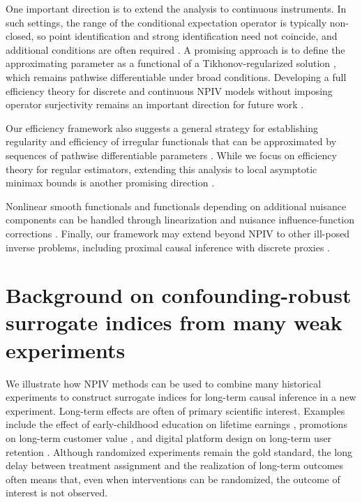 \documentclass[11pt]{article}
\theoremstyle{plain}
\theoremstyle{definition}
\theoremstyle{remark}
\theoremstyle{definition}
\begin{document}
One important direction is to extend the analysis to continuous instruments. In
such settings, the range of the conditional expectation operator is typically
non-closed, so point identification and strong identification need not coincide,
and additional conditions are often required
\citep{severini2006some, darolles2011nonparametric, bennett2023inference}. A
promising approach is to define the approximating parameter as a functional of a
Tikhonov-regularized solution \citep{engl2015regularization}, which remains
pathwise differentiable under broad conditions. Developing a full efficiency
theory for discrete and continuous NPIV models without imposing operator
surjectivity remains an important direction for future work
\citep{ai2003efficient, khan2010semiparametric, ai2012semiparametric,
chen2018overidentification}.

Our efficiency framework also suggests a general strategy for establishing
regularity and efficiency of irregular functionals that can be approximated by
sequences of pathwise differentiable parameters
\citep{bibaut2017data, luedtke2024one}. While we focus on efficiency theory for
regular estimators, extending this analysis to local asymptotic minimax bounds
is another promising direction \citep{hajek1972local}.

Nonlinear smooth functionals and functionals depending on additional nuisance
components can be handled through linearization and nuisance influence-function
corrections \citep{van2025automatic2}. Finally, our framework may extend beyond
NPIV to other ill-posed inverse problems, including proximal causal inference
with discrete proxies \citep{tchetgen2020introduction, cui2024semiparametric}.




\appendix

\section{Background on confounding-robust surrogate indices from many weak experiments}\label{sec: surrogates}

We illustrate how NPIV methods can be used to combine many historical experiments to construct surrogate indices for long-term causal inference in a new experiment. Long-term effects are often of primary scientific interest. Examples include the effect of early-childhood education on lifetime earnings \citep{chetty2011does}, promotions on long-term customer value \citep{yang2020targeting}, and digital platform design on long-term user retention \citep{hohnhold2015focusing}. Although randomized experiments remain the gold standard, the long delay between treatment assignment and the realization of long-term outcomes often means that, even when interventions can be randomized, the outcome of interest is not observed.
 
\end{document}
